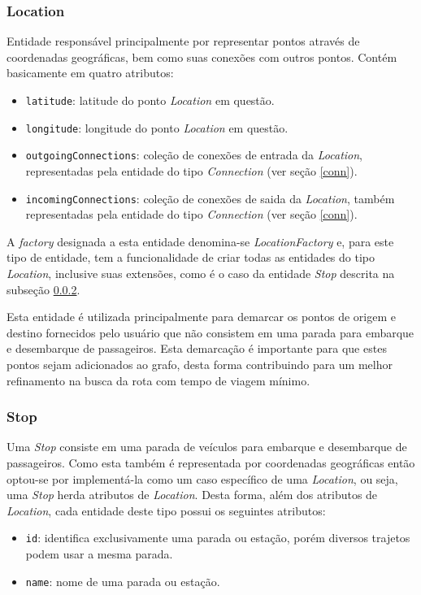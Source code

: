 \subsubsection{Location}
Entidade responsável principalmente por representar pontos através de coordenadas geográficas, bem como suas conexões com outros pontos.
Contém basicamente em quatro atributos: 

\begin{itemize}
	\item \texttt{latitude}: latitude do ponto \emph{Location} em questão.
	\item \texttt{longitude}: longitude do ponto \emph{Location} em questão.
	\item \texttt{outgoingConnections}: coleção de conexões de entrada da \emph{Location}, representadas pela entidade do tipo \emph{Connection} (ver seção 					  \ref{conn}).
	\item \texttt{incomingConnections}: coleção de conexões de saida da \emph{Location}, também representadas pela entidade do tipo \emph{Connection} (ver seção 			  	  \ref{conn}).
\end{itemize}

A \emph{factory} designada a esta entidade denomina-se \emph{LocationFactory} e, para este tipo de entidade, tem a funcionalidade de criar todas as entidades do tipo \emph{Location}, inclusive  suas extensões, como é o caso da entidade \emph{Stop} descrita na subseção \ref{stop}.

Esta entidade é utilizada principalmente para demarcar os pontos de origem e destino fornecidos pelo usuário que não consistem em uma parada para embarque e desembarque de passageiros.
Esta demarcação é importante para que estes pontos sejam adicionados ao grafo, desta forma contribuindo para um melhor refinamento na busca da rota com tempo de viagem mínimo.

\subsubsection{Stop}
\label{stop}
Uma \emph{Stop} consiste em uma parada de veículos para embarque e desembarque de passageiros.
Como esta também é representada por coordenadas geográficas então optou-se por implementá-la como um caso específico de uma \emph{Location}, ou seja, uma \emph{Stop} herda atributos de \emph{Location}. Desta forma, além dos atributos de \emph{Location}, cada entidade deste tipo possui os seguintes atributos:

\begin{itemize}
	\item \texttt{id}: identifica exclusivamente uma parada ou estação, porém diversos trajetos podem usar a mesma parada.
	\item \texttt{name}: nome de uma parada ou estação.
\end{itemize}

